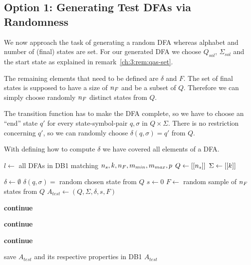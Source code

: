 \subsection{Option 1: Generating Test DFAs via Randomness}

We now approach the task of generating a random DFA whereas alphabet and number of (final) states are set. For our generated DFA we choose $Q_{sol}$, $\Sigma_{sol}$ and the start state as explained in remark~\ref{ch:3:rem:qas-set}.

The remaining elements that need to be defined are $\delta$ and $F$. The set of final states is supposed to have a size of ${n_F}$ and be a subset of $Q$. Therefore we can simply choose randomly ${n_F}$ distinct states from $Q$.

The transition function has to make the DFA complete, so we have to choose an ``end'' state $q'$ for every state-symbol-pair $q,\sigma$ in $Q \times \Sigma$. There is no restriction concerning $q'$, so we can randomly choose $\delta(q, \sigma) = q'$ from $Q$.

With defining how to compute $\delta$ we have covered all elements of a DFA.

\vspace{0.2cm}
\begin{algorithmic}[1]
	
		\vspace{0.2cm}
	
		\State $l \gets$ all DFAs in DB1 matching ${n_s}, k, {n_F}, m_{min}, m_{max}, p$
		\State $Q \gets[[{n_s}]]$
		\State $\Sigma \gets [[k]]$
		
		\vspace{0.2cm}
		
		
		\vspace{0.2cm}
		
			\State $\delta \gets \emptyset$
					\State $\delta(q,\sigma) = $ random chosen state from $Q$
				\EndFor
			\EndFor
			\State $s \gets 0$
			\State $F \gets$ random sample of ${n_F}$ states from $Q$
			\State $A_{test} \gets (Q, \Sigma, \delta, s, F)$
			
			\vspace{0.2cm}
			
			\State \textbf{continue}
			\EndIf
			
			\State \textbf{continue}
			\EndIf
			
			\State \textbf{continue}
			\EndIf
			
			\vspace{0.2cm}
			
			\State save $A_{test}$ and its respective properties in DB1
			\State\Return $A_{test}$
		\EndWhile
	\EndFunction
\end{algorithmic}
\vspace{0.2cm}

